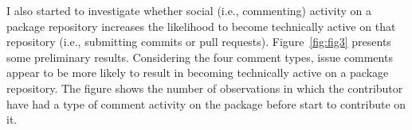 I also started to investigate whether social (i.e., commenting) activity on a package repository increases the likelihood to become technically active on that repository (i.e., submitting commits or pull requests). 
Figure~\ref{fig:fig3} presents some preliminary results. Considering the four comment types, issue comments appear to be more likely to result in becoming technically active on a package repository.
The figure shows the number of observations in which the contributor have had a type of comment activity on the package before start to contribute on it.





